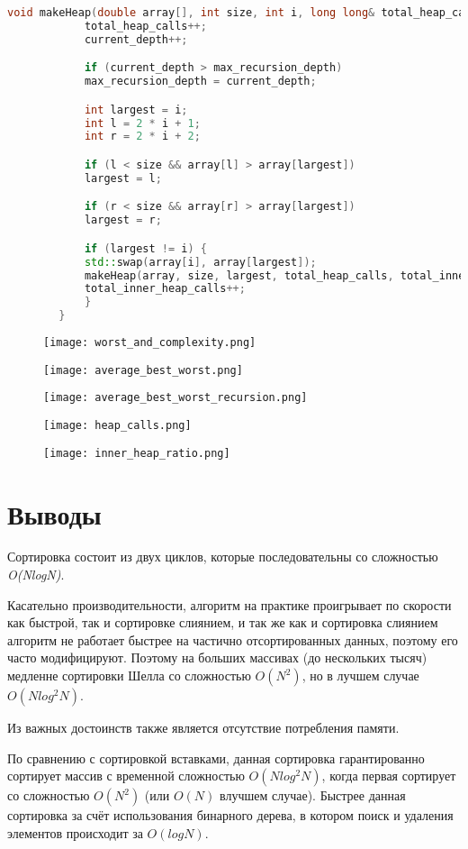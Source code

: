 \documentclass[12pt, a4paper]{report}
\begin{document}
	\begin{lstlisting}[language=C++]
		void makeHeap(double array[], int size, int i, long long& total_heap_calls, long long& total_inner_heap_calls, long long& current_depth, long long& max_recursion_depth) {
		    total_heap_calls++;
		    current_depth++;

		    if (current_depth > max_recursion_depth)
			max_recursion_depth = current_depth;

		    int largest = i;
		    int l = 2 * i + 1;
		    int r = 2 * i + 2;

		    if (l < size && array[l] > array[largest])
			largest = l;

		    if (r < size && array[r] > array[largest])
			largest = r;

		    if (largest != i) {
			std::swap(array[i], array[largest]);
			makeHeap(array, size, largest, total_heap_calls, total_inner_heap_calls, current_depth, max_recursion_depth);
			total_inner_heap_calls++;
		    }
		}
	\end{lstlisting}

	\newpage
	\vfill

	\begin{figure}
		\texttt{[image: worst\_and\_complexity.png]}
	\end{figure}
	\begin{figure}
		\texttt{[image: average\_best\_worst.png]}
	\end{figure}
	\begin{figure}
		\texttt{[image: average\_best\_worst\_recursion.png]}
	\end{figure}
	\begin{figure}
		\texttt{[image: heap\_calls.png]}
	\end{figure}
	\begin{figure}
		\texttt{[image: inner\_heap\_ratio.png]}
	\end{figure}

	\vfill
	\clearpage

	\section*{Выводы}
	Сортировка состоит из двух циклов, которые последовательны со сложностью \textit{O(NlogN)}. \par
	Касательно производительности, алгоритм на практике проигрывает по скорости как быстрой, так и сортировке слиянием, и так же как и сортировка слиянием алгоритм не работает быстрее на частично отсортированных данных, поэтому его часто модифицируют. Поэтому на больших массивах (до нескольких тысяч) медленне сортировки Шелла со сложностью \( O(N^2) \), но в лучшем случае \( O(Nlog^2N) \). \par
	Из важных достоинств также является отсутствие потребления памяти. \par
	По сравнению с сортировкой вставками, данная сортировка гарантированно сортирует массив с временной сложностью \( O(Nlog^2N) \), когда первая сортирует со сложностью \( O(N^2) \) (или \( O(N) \) влучшем случае). Быстрее данная сортировка за счёт использования бинарного дерева, в котором поиск и удаления элементов происходит за \( O(logN) \). 
\end{document}

